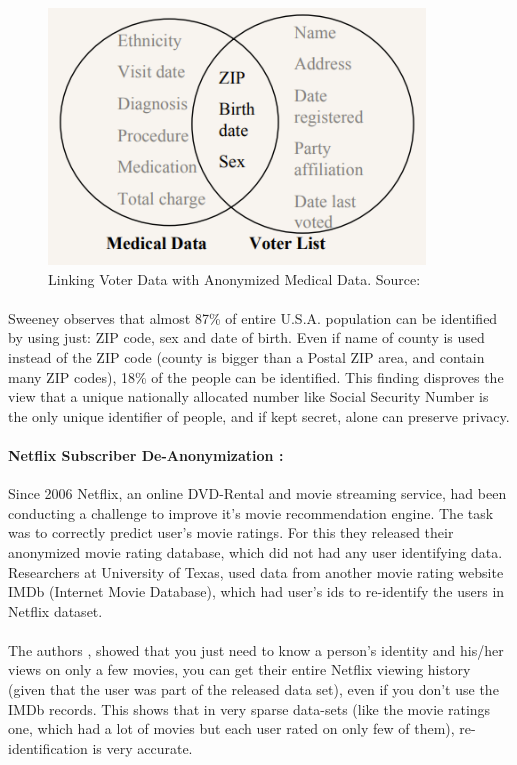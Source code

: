 \documentclass[12pt]{report}
\theoremstyle{named}
\begin{document}
\begin{figure}[ht]
\centering
        \includegraphics[width=100mm,scale=0.5]{Images/GovMassReId.PNG}
    \caption{Linking Voter Data with Anonymized Medical Data. Source:\cite{sweeney2000uniqueness}}
    \label{fig:voterMedical}
\end{figure}
\paragraph{}
Sweeney observes that almost 87\% of entire U.S.A. population can be identified by using just: ZIP code, sex and date of birth. Even if name of county is used instead of the ZIP code (county is bigger than a Postal ZIP area, and contain many ZIP codes), 18\% of the people can be identified. This finding disproves the view that a unique nationally allocated number like Social Security Number is the only unique identifier of people, and if kept secret, alone can preserve privacy.


\paragraph{Netflix Subscriber De-Anonymization \cite{narayanan2008robust}:\\}
Since 2006 Netflix, an online DVD-Rental and movie streaming service, had been conducting a challenge to improve it's movie recommendation engine. The task was to correctly predict user's movie ratings. For this they released their anonymized movie rating database, which did not had any user identifying data. Researchers at University of Texas, used data from another movie rating website IMDb (Internet Movie Database), which had user's ids to re-identify the users in Netflix dataset.
\paragraph{}
The authors \cite{narayanan2008robust}, showed that you just need to know a person's identity and his/her views on only a few movies, you can get their entire Netflix viewing history (given that the user was part of the released data set), even if you don't use the IMDb records. This shows that in very sparse data-sets (like the movie ratings one, which had a lot of movies but each user rated on only few of them), re-identification is very accurate.
\end{document}
